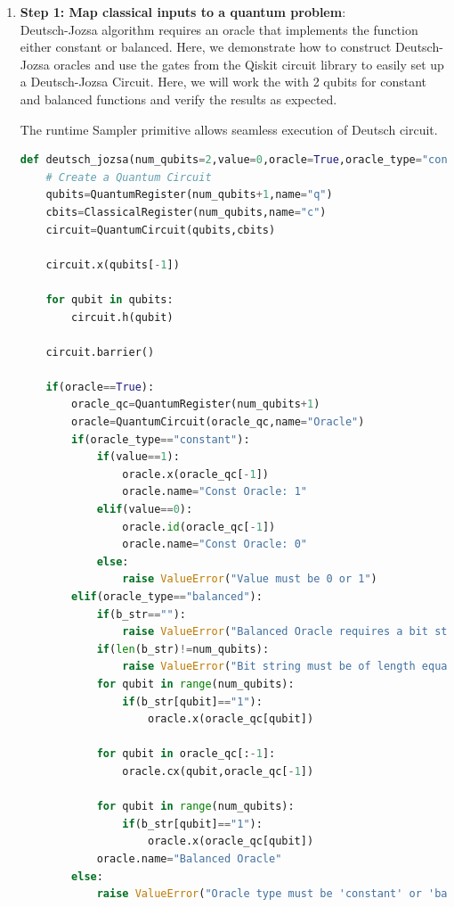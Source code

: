 \documentclass[12pt, oneside]{book}
\theoremstyle{definition}
\theoremstyle{definition}
\theoremstyle{remark}
\begin{document}
\begin{enumerate}
    \item \textbf{Step 1: Map classical inputs to a quantum problem}: \\
    Deutsch-Jozsa algorithm requires an oracle that implements the function either constant or balanced. Here, we demonstrate how to construct Deutsch-Jozsa oracles and use the gates from the Qiskit circuit library to easily set up a Deutsch-Jozsa Circuit. Here, we will work the  with 2 qubits for constant and balanced functions and verify the results as expected.

The runtime Sampler primitive allows seamless execution of Deutsch circuit.
    \begin{lstlisting}[language=Python]
def deutsch_jozsa(num_qubits=2,value=0,oracle=True,oracle_type="constant",b_str=""):
    # Create a Quantum Circuit
    qubits=QuantumRegister(num_qubits+1,name="q")
    cbits=ClassicalRegister(num_qubits,name="c")
    circuit=QuantumCircuit(qubits,cbits)

    circuit.x(qubits[-1])

    for qubit in qubits:
        circuit.h(qubit)
    
    circuit.barrier()

    if(oracle==True):
        oracle_qc=QuantumRegister(num_qubits+1)
        oracle=QuantumCircuit(oracle_qc,name="Oracle")
        if(oracle_type=="constant"):
            if(value==1):
                oracle.x(oracle_qc[-1])
                oracle.name="Const Oracle: 1"
            elif(value==0):
                oracle.id(oracle_qc[-1])
                oracle.name="Const Oracle: 0"
            else:
                raise ValueError("Value must be 0 or 1")
        elif(oracle_type=="balanced"):
            if(b_str==""):
                raise ValueError("Balanced Oracle requires a bit string")
            if(len(b_str)!=num_qubits):
                raise ValueError("Bit string must be of length equal to number of qubits")
            for qubit in range(num_qubits):
                if(b_str[qubit]=="1"):
                    oracle.x(oracle_qc[qubit])
            
            for qubit in oracle_qc[:-1]:
                oracle.cx(qubit,oracle_qc[-1])

            for qubit in range(num_qubits):
                if(b_str[qubit]=="1"):
                    oracle.x(oracle_qc[qubit])
            oracle.name="Balanced Oracle"
        else:
            raise ValueError("Oracle type must be 'constant' or 'balanced'")
            

\end{lstlisting}
\end{enumerate}
\end{document}

